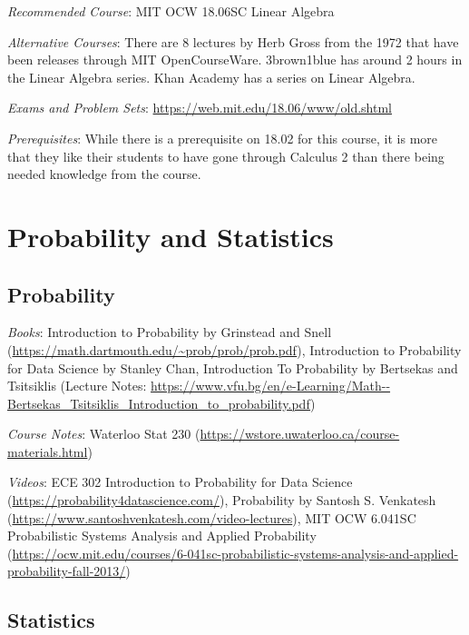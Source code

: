 \documentclass[openany,10pt]{book}
\begin{document}
\noindent \textit{Recommended Course}: MIT OCW 18.06SC Linear Algebra\newline

\noindent \textit{Alternative Courses}: There are 8 lectures by Herb Gross from the 1972 that have been releases through MIT OpenCourseWare.  3brown1blue has around 2 hours in the Linear Algebra series.  Khan Academy has a series on Linear Algebra.  \newline

\noindent \textit{Exams and Problem Sets}: \url{https://web.mit.edu/18.06/www/old.shtml}

\noindent \textit{Prerequisites}: While there is a prerequisite on 18.02 for this course, it is more that they like their students to have gone through Calculus 2 than there being needed knowledge from the course.

\part{Probability and Statistics}

\chapter{Probability}

\textit{Books}: Introduction to Probability by Grinstead and Snell (\url{https://math.dartmouth.edu/~prob/prob/prob.pdf}), Introduction to Probability for Data Science by Stanley Chan, Introduction To Probability by Bertsekas and Tsitsiklis (Lecture Notes: \url{https://www.vfu.bg/en/e-Learning/Math--Bertsekas\_Tsitsiklis\_Introduction\_to\_probability.pdf})\newline

\noindent \textit{Course Notes}: Waterloo Stat 230 (\url{https://wstore.uwaterloo.ca/course-materials.html})\newline

\noindent \textit{Videos}: ECE 302 Introduction to Probability for Data Science (\url{https://probability4datascience.com/}), Probability by Santosh S. Venkatesh (\url{https://www.santoshvenkatesh.com/video-lectures}), MIT OCW 6.041SC Probabilistic Systems Analysis and Applied Probability (\url{https://ocw.mit.edu/courses/6-041sc-probabilistic-systems-analysis-and-applied-probability-fall-2013/})\newline

\chapter{Statistics}
\end{document}
